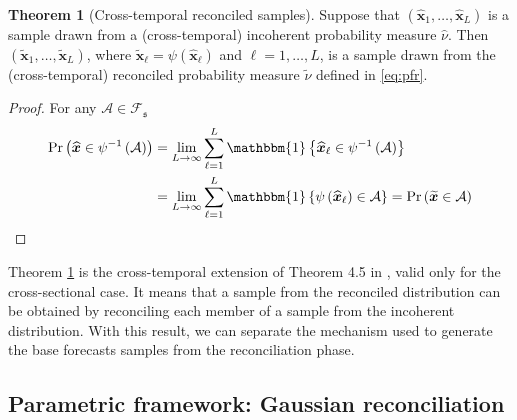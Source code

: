 \documentclass[12pt]{article}
\newcommand{\xvet}{\bm{x}}
\theoremstyle{definition}
\newtheorem{theorem}{Theorem}[section]
\begin{document}
\begin{theorem}[Cross-temporal reconciled samples] \label{thm:rs}
	Suppose that $(\widehat{\xvet}_1, \dots, \widehat{\xvet}_L)$ is a sample drawn from a (cross-temporal) incoherent probability measure $\widehat{\nu}$. Then $(\widetilde{\xvet}_1, \dots, \widetilde{\xvet}_L)$, where $\widetilde{\xvet}_\ell=\psi(\widehat{\xvet}_\ell)$ and $\ell= 1, \dots, L$, is a sample drawn from the (cross-temporal) reconciled probability measure $\widetilde{\nu}$ defined in \eqref{eq:pfr}.
\end{theorem}
\begin{proof}
	For any $\mathcal{A} \in \mathcal{F}_{\mathfrak{s}}$
	\begin{align*}
		\text{Pr}\left(\widehat{\xvet} \in \psi^{-1}\left(\mathcal{A}\right) \right) & = \lim_{L\rightarrow\infty} \sum_{\ell = 1}^L \mathbbm{1}\left\{\widehat{\xvet}_\ell \in \psi^{-1}\left(\mathcal{A}\right)\right\} \\
		& = \lim_{L\rightarrow\infty} \sum_{\ell = 1}^L \mathbbm{1}\left\{\psi\left(\widehat{\xvet}_\ell\right) \in \mathcal{A}\right\} = \text{Pr}\left(\widetilde{\xvet} \in\mathcal{A} \right)
	\end{align*}
\end{proof}
Theorem \ref{thm:rs} is the cross-temporal extension of Theorem 4.5 in \cite{panagiotelis2023}, valid only for the cross-sectional case. It means that a sample from the reconciled distribution can be obtained by reconciling each member of a sample from the incoherent distribution. With this result, we can separate the mechanism used to generate the base forecasts samples from the reconciliation phase.


\subsection{Parametric framework: Gaussian reconciliation}\label{ssec:prob_pf}
\end{document}
